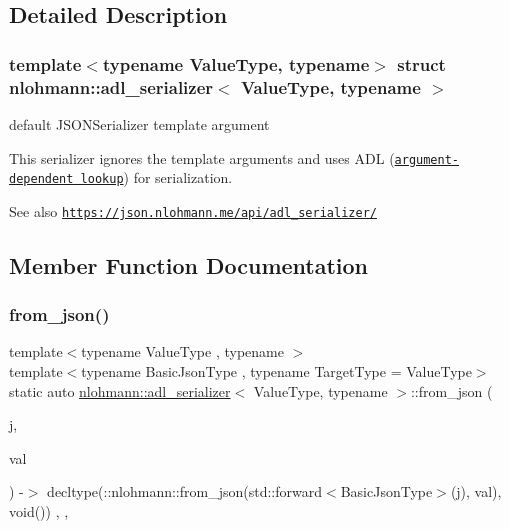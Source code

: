 \subsection{Detailed Description}
\subsubsection*{template$<$typename Value\+Type, typename$>$\newline
struct nlohmann\+::adl\+\_\+serializer$<$ Value\+Type, typename $>$}

default J\+S\+O\+N\+Serializer template argument 

This serializer ignores the template arguments and uses A\+DL (\href{https://en.cppreference.com/w/cpp/language/adl}{\tt argument-\/dependent lookup}) for serialization.

\begin{DoxySeeAlso}{See also}
\href{https://json.nlohmann.me/api/adl_serializer/}{\tt https\+://json.\+nlohmann.\+me/api/adl\+\_\+serializer/} 
\end{DoxySeeAlso}


\subsection{Member Function Documentation}
\mbox{\label{structnlohmann_1_1adl__serializer_a8180f52bf21fc610705bc521f22116ae}} 
\subsubsection{\texorpdfstring{from\+\_\+json()}{from\_json()}\hspace{0.1cm}{\footnotesize\ttfamily [1/2]}}
{\footnotesize\ttfamily template$<$typename Value\+Type , typename $>$ \\
template$<$typename Basic\+Json\+Type , typename Target\+Type  = Value\+Type$>$ \\
static auto \hyperlink{structnlohmann_1_1adl__serializer}{nlohmann\+::adl\+\_\+serializer}$<$ Value\+Type, typename $>$\+::from\+\_\+json (\begin{DoxyParamCaption}\item[{Basic\+Json\+Type \&\&}]{j,  }\item[{Target\+Type \&}]{val }\end{DoxyParamCaption}) -\/$>$ decltype(\+::nlohmann\+::from\+\_\+json(std\+::forward$<$Basic\+Json\+Type$>$(j), val), void())
    \hspace{0.3cm}{\ttfamily [inline]}, {\ttfamily [static]}, {\ttfamily [noexcept]}}



